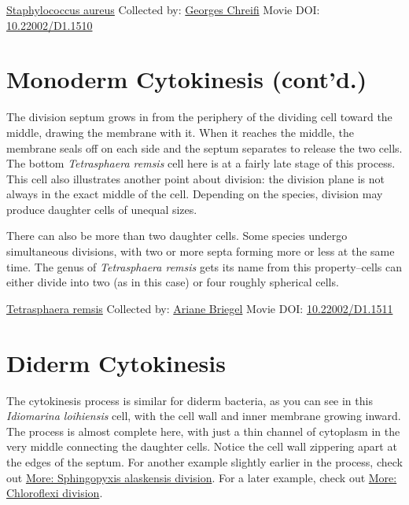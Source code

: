 \documentclass[]{tufte-book}
\begin{document}
\hypertarget{htmlwidget-1f75acb000376256149f}{}

\label{fig:5-4}\protect\hyperlink{tree}{Staphylococcus aureus} Collected by: \protect\hyperlink{georges_chreifi}{Georges Chreifi} Movie DOI: \href{https://doi.org/10.22002/D1.1510}{10.22002/D1.1510}

\hypertarget{monoderm-cytokinesis-contd.}{%
\section{Monoderm Cytokinesis (cont'd.)}\label{monoderm-cytokinesis-contd.}}

The division septum grows in from the periphery of the dividing cell toward the middle, drawing the membrane with it. When it reaches the middle, the membrane seals off on each side and the septum separates to release the two cells. The bottom \emph{Tetrasphaera remsis} cell here is at a fairly late stage of this process. This cell also illustrates another point about division: the division plane is not always in the exact middle of the cell. Depending on the species, division may produce daughter cells of unequal sizes.

There can also be more than two daughter cells. Some species undergo simultaneous divisions, with two or more septa forming more or less at the same time. The genus of \emph{Tetrasphaera remsis} gets its name from this property--cells can either divide into two (as in this case) or four roughly spherical cells.



\hypertarget{htmlwidget-28824b2d1e601b2cad01}{}

\label{fig:5-5}\protect\hyperlink{tree}{Tetrasphaera remsis} Collected by: \protect\hyperlink{ariane_briegel}{Ariane Briegel} Movie DOI: \href{https://doi.org/10.22002/D1.1511}{10.22002/D1.1511}

\hypertarget{diderm-cytokinesis}{%
\section{Diderm Cytokinesis}\label{diderm-cytokinesis}}

The cytokinesis process is similar for diderm bacteria, as you can see in this \emph{Idiomarina loihiensis} cell, with the cell wall and inner membrane growing inward. The process is almost complete here, with just a thin channel of cytoplasm in the very middle connecting the daughter cells. Notice the cell wall zippering apart at the edges of the septum. For another example slightly earlier in the process, check out \protect\hyperlink{Sphingopyxis_alaskensis_division}{More: Sphingopyxis alaskensis division}. For a later example, check out \protect\hyperlink{Chloroflexi_division}{More: Chloroflexi division}.
\end{document}
